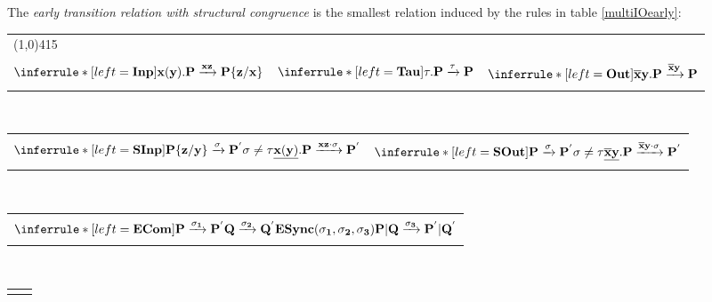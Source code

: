 \begin{definition}
  The \emph{early transition relation with structural congruence} is the smallest relation induced by the rules in table \ref{multiIOearly}:
  \begin{table}
    \begin{tabular}{lll}
	  \multicolumn{3}{l}{\line(1,0){415}}\\\\
	  $\inferrule* [left=\bf{Inp}]{
	  }{
	    x(y).P \xrightarrow{xz} P\{z/x\}
	  }$
	&
	  $\inferrule* [left=\bf{Tau}]{
	  }{
	    \tau.P \xrightarrow{\tau} P
	  }$
	&
	  $\inferrule* [left=\bf{Out}]{
	  }{
	    \overline{x}y.P \xrightarrow{\overline{x}y} P
	  }$
      \\\\
      \end{tabular}\\
      \begin{tabular}{ll}
      \\\\
	  $\inferrule* [left=\bf{SInp}]{
	      P\{z/y\} \xrightarrow{\sigma} P^{'} 
	    \\
	      \sigma\neq \tau
	  }{
	    \underline{x(y)}.P \xrightarrow{xz \cdot \sigma} P^{'}
	  }$
	&
	  $\inferrule* [left=\bf{SOut}]{
	      P \xrightarrow{\sigma} P^{'} 
	    \\
	      \sigma\neq \tau
	  }{
	    \underline{\overline{x}y}.P \xrightarrow{\overline{x}y \cdot \sigma} P^{'}
	  }$
      \\\\
      \end{tabular}\\
      \begin{tabular}{l}
      \\\\
	  $\inferrule* [left=\bf{ECom}]{
	      P \xrightarrow{\sigma_{1}} P^{'}
	    \\
	      Q\xrightarrow{\sigma_{2}} Q^{'}
	    \\
	      ESync(\sigma_{1}, \sigma_{2}, \sigma_{3})
	  }{
	    P|Q \xrightarrow{\sigma_{3}} P^{'}|Q^{'}
	  }$
      \\\\
      \end{tabular}\\
      \begin{tabular}{ll}
      \\\\

\end{tabular}
\end{table}
\end{definition}
